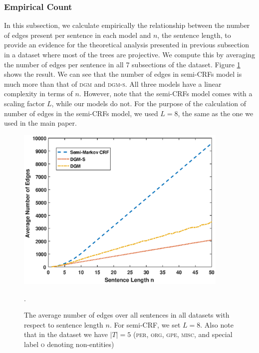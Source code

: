 \subsubsection{Empirical Count}
In this subsection, we calculate empirically the relationship between the number of edges present per sentence in each model and $n$, the sentence length, to provide an evidence for the theoretical analysis presented in previous subsection in a dataset where most of the trees are projective. We compute this by averaging the number of edges per sentence in all 7 subsections of the dataset. Figure \ref{fig:ncomplexity} shows the result. We can see that the number of edges in semi-CRFs model is much more than that of \textsc{dgm} and \textsc{dgm-s}. All three models have a linear complexity in terms of $n$. However, note that the semi-CRFs model comes with a scaling factor $L$, while our models do not. For the purpose of the calculation of number of edges in the semi-CRFs model, we used $L=8$, the same as the one we used in the main paper.
\begin{figure}[h!]
	\centering
	\includegraphics[width=4in]{Figures/ncomplexity.eps}
	\caption{The average number of edges over all sentences in all datasets with respect to sentence length $n$. For semi-CRF, we set $L=8$. Also note that in the dataset we have $\left\lvert T\right\rvert=5$ (\textsc{per}, \textsc{org}, \textsc{gpe}, \textsc{misc}, and special label \textsc{o} denoting non-entities)}.
	\label{fig:ncomplexity}
\end{figure}

